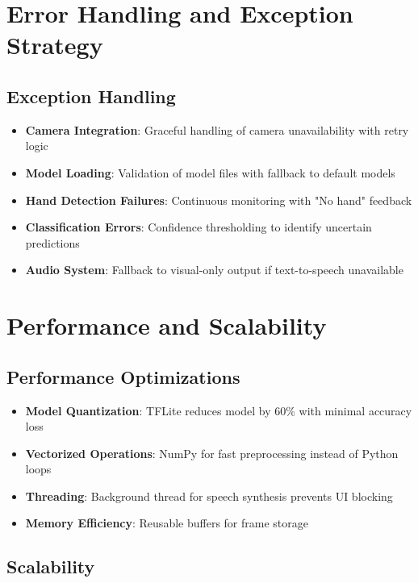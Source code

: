 \section{Error Handling and Exception Strategy}

\subsection{Exception Handling}

\begin{itemize}
    \item \textbf{Camera Integration}: Graceful handling of camera unavailability with retry logic
    \item \textbf{Model Loading}: Validation of model files with fallback to default models
    \item \textbf{Hand Detection Failures}: Continuous monitoring with "No hand" feedback
    \item \textbf{Classification Errors}: Confidence thresholding to identify uncertain predictions
    \item \textbf{Audio System}: Fallback to visual-only output if text-to-speech unavailable
\end{itemize}

\section{Performance and Scalability}

\subsection{Performance Optimizations}

\begin{itemize}
    \item \textbf{Model Quantization}: TFLite reduces model by 60\% with minimal accuracy loss
    \item \textbf{Vectorized Operations}: NumPy for fast preprocessing instead of Python loops
    \item \textbf{Threading}: Background thread for speech synthesis prevents UI blocking
    \item \textbf{Memory Efficiency}: Reusable buffers for frame storage
\end{itemize}

\subsection{Scalability}


